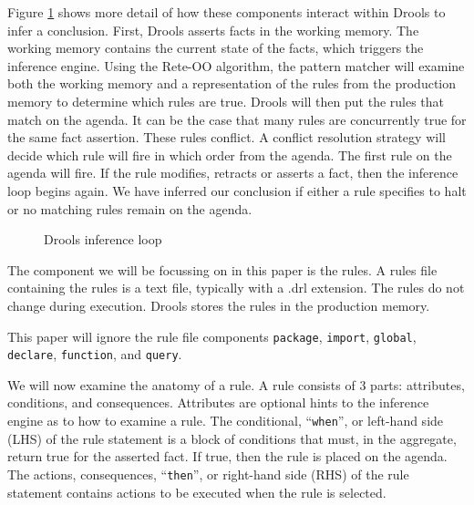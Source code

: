 Figure \ref{fig:Drools_inference_loop} shows more detail of how these components interact within Drools to infer a conclusion.
First, Drools asserts facts in the working memory.
The working memory contains the current state of the facts, which triggers the inference engine.
Using the Rete-OO algorithm, the pattern matcher will examine both the working memory and a representation of the rules from the production memory to determine which rules are true.
Drools will then put the rules that match on the agenda.
It can be the case that many rules are concurrently true for the same fact assertion.
These rules conflict.
A conflict resolution strategy will decide which rule will fire in which order from the agenda.
The first rule on the agenda will fire.
If the rule modifies, retracts or asserts a fact, then the inference loop begins again.
We have inferred our conclusion if either a rule specifies to halt or no matching rules remain on the agenda.

\begin{figure}[h]
    \centering
    \caption{Drools inference loop}
    \label{fig:Drools_inference_loop}
\end{figure}

The component we will be focussing on in this paper is the rules.
A rules file containing the rules is a text file, typically with a .drl extension.
The rules do not change during execution.
Drools stores the rules in the production memory.

This paper will ignore the rule file components \texttt{package}, \texttt{import}, \texttt{global}, \texttt{declare}, \texttt{function}, and \texttt{query}.

We will now examine the anatomy of a rule.
A rule consists of 3 parts: attributes, conditions, and consequences.
Attributes are optional hints to the inference engine as to how to examine a rule.
The conditional, ``\texttt{when}'', or left-hand side (LHS) of the rule statement is a block of conditions that must, in the aggregate, return true for the asserted fact. 
If true, then the rule is placed on the agenda.
The actions, consequences, ``\texttt{then}'', or right-hand side (RHS) of the rule statement contains actions to be executed when the rule is selected.

